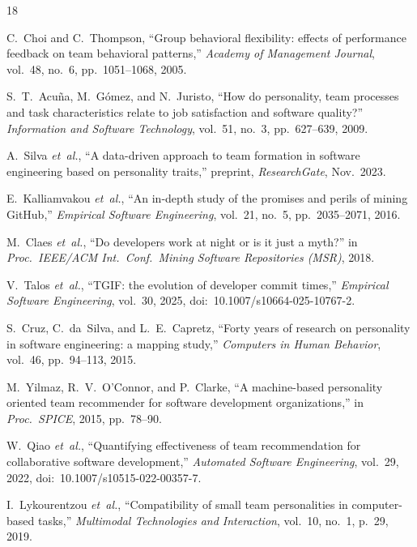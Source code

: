 \documentclass[conference]{IEEEtran}
\begin{document}
\begin{thebibliography}{18}

  C.~Choi and C.~Thompson,
  ``Group behavioral flexibility: effects of performance feedback on
  team behavioral patterns,''
  \textit{Academy of Management Journal},
  vol.~48, no.~6, pp.~1051--1068, 2005.

  S.~T.~Acu\~{n}a, M.~G\'{o}mez, and N.~Juristo,
  ``How do personality, team processes and task characteristics relate
  to job satisfaction and software quality?''
  \textit{Information and Software Technology},
  vol.~51, no.~3, pp.~627--639, 2009.

  A.~Silva \textit{et~al.},
  ``A data-driven approach to team formation in software engineering
  based on personality traits,''
  preprint, \textit{ResearchGate}, Nov.~2023.

  E.~Kalliamvakou \textit{et~al.},
  ``An in-depth study of the promises and perils of mining {GitHub},''
  \textit{Empirical Software Engineering},
  vol.~21, no.~5, pp.~2035--2071, 2016.

  M.~Claes \textit{et~al.},
  ``Do developers work at night or is it just a myth?''
  in \textit{Proc.\ IEEE/ACM Int.\ Conf.\ Mining Software
  Repositories (MSR)}, 2018.

  V.~Talos \textit{et~al.},
  ``{TGIF}: the evolution of developer commit times,''
  \textit{Empirical Software Engineering},
  vol.~30, 2025,
  doi:~10.1007/s10664-025-10767-2.

  S.~Cruz, C.~da~Silva, and L.~E.~Capretz,
  ``Forty years of research on personality in software engineering:
  a mapping study,''
  \textit{Computers in Human Behavior},
  vol.~46, pp.~94--113, 2015.

  M.~Yilmaz, R.~V.~O'Connor, and P.~Clarke,
  ``A machine-based personality oriented team recommender for software
  development organizations,''
  in \textit{Proc.\ SPICE}, 2015, pp.~78--90.

  W.~Qiao \textit{et~al.},
  ``Quantifying effectiveness of team recommendation for collaborative
  software development,''
  \textit{Automated Software Engineering},
  vol.~29, 2022,
  doi:~10.1007/s10515-022-00357-7.

  I.~Lykourentzou \textit{et~al.},
  ``Compatibility of small team personalities in computer-based
  tasks,''
  \textit{Multimodal Technologies and Interaction},
  vol.~10, no.~1, p.~29, 2019.


\end{thebibliography}
\end{document}

